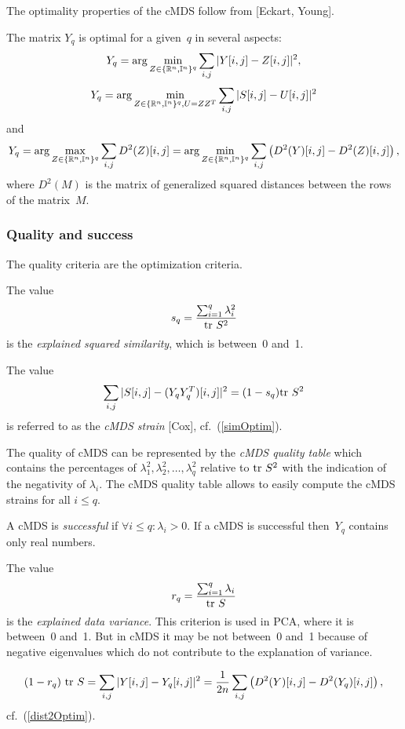 \documentclass[10pt,a4paper]{article}
\begin{document}
The optimality properties of the cMDS follow from [Eckart, Young].

The matrix $Y_q$ is optimal for a given~$q$ in several aspects:
$$ Y_q = \arg \min_{Z \in \{\mathbb R^n,\mathbb I^n\}^q} \sum_{i,j} |Y [i,j]-Z[i,j]|^2, $$
\begin{equation} \label{simOptim}
 Y_q = \arg \min_{Z\in \{\mathbb R^n,\mathbb I^n\}^q,U=ZZ^T} \sum_{i,j} |S[i,j]-U[i,j]|^2 
\end{equation}
and
\begin{equation} \label{dist2Optim}
Y_q = \arg \max_{Z\in \{\mathbb R^n,\mathbb I^n\}^q} \sum_{i,j} D^2(Z)[i,j] = 
  \arg \min_{Z \in \{\mathbb R^n,\mathbb I^n\}^q} \sum_{i,j} \left(D^2(Y)[i,j] - D^2(Z)[i,j] \right),
\end{equation}
where $D^2(M)$ is the matrix of generalized squared distances between the rows of the matrix~$M$.


\subsubsection {Quality and success}

The quality criteria are the optimization criteria.

The value
$$ s_q = \frac { \sum_{i=1}^q \lambda_i^2} {\mathrm {tr} \  S^2} $$
is the {\em explained squared similarity}, which is between~0 and~1.

The value
$$ \sum_{i,j} |S[i,j]-(Y_q Y_q^T)[i,j]|^2 = (1 - s_q) \mathrm {tr} \  S^2 $$
is referred to as the {\em cMDS strain} [Cox],
cf.~(\ref{simOptim}).

The quality of cMDS can be represented by the {\em cMDS quality table} which contains the percentages of $\lambda_1^2, \lambda_2^2, \dots, \lambda_q^2$ relative to $\mathrm {tr} \  S^2$ with the indication of the negativity of $\lambda_i$.
The cMDS quality table allows to easily compute the cMDS strains for all $i \le q$.

A cMDS is {\em successful} if $\forall i \le q : \lambda_i > 0$.
If a cMDS is successful then~$Y_q$ contains only real numbers.

The value
$$ r_q = \frac {\sum_{i=1}^q \lambda_i} {\mathrm {tr} \  S} $$
is the {\em explained data variance}. 
This criterion is used in PCA, where it is between~0 and~1. 
But in cMDS it may be not between~0 and~1 because of negative eigenvalues which do not contribute to the explanation of variance.

$$ (1 - r_q) \ \mathrm {tr} \  S = \sum_{i,j} |Y [i,j]-Y_q [i,j]|^2 = \frac 1 {2n} \sum_{i,j} \left(D^2(Y)[i,j] - D^2(Y_q)[i,j] \right), $$
cf.~(\ref{dist2Optim}).
\comm{}
\end{document}
